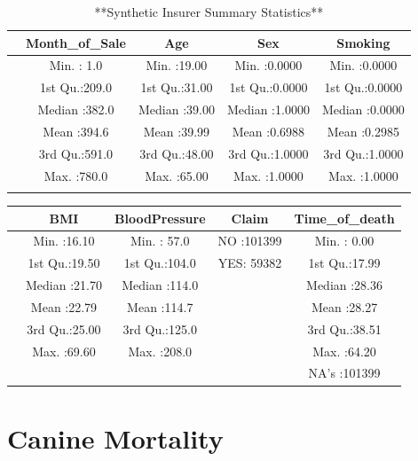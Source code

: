 \documentclass[
]{book}
\begin{document}
\begin{table}

\caption{\label{tab:unnamed-chunk-17}**Synthetic Insurer Summary Statistics**}
\centering
\begin{tabular}[t]{l|c|c|c|c}
\hline
  & Month\_of\_Sale &      Age &      Sex &    Smoking\\
\hline
 & Min.   :  1.0 & Min.   :19.00 & Min.   :0.0000 & Min.   :0.0000\\
\hline
 & 1st Qu.:209.0 & 1st Qu.:31.00 & 1st Qu.:0.0000 & 1st Qu.:0.0000\\
\hline
 & Median :382.0 & Median :39.00 & Median :1.0000 & Median :0.0000\\
\hline
 & Mean   :394.6 & Mean   :39.99 & Mean   :0.6988 & Mean   :0.2985\\
\hline
 & 3rd Qu.:591.0 & 3rd Qu.:48.00 & 3rd Qu.:1.0000 & 3rd Qu.:1.0000\\
\hline
 & Max.   :780.0 & Max.   :65.00 & Max.   :1.0000 & Max.   :1.0000\\
\hline
 &  &  &  & \\
\hline
\end{tabular}
\end{table}

\begin{table}
\centering
\begin{tabular}{l|c|c|c|c}
\hline
  &      BMI & BloodPressure & Claim & Time\_of\_death\\
\hline
 & Min.   :16.10 & Min.   : 57.0 & NO :101399 & Min.   : 0.00\\
\hline
 & 1st Qu.:19.50 & 1st Qu.:104.0 & YES: 59382 & 1st Qu.:17.99\\
\hline
 & Median :21.70 & Median :114.0 &  & Median :28.36\\
\hline
 & Mean   :22.79 & Mean   :114.7 &  & Mean   :28.27\\
\hline
 & 3rd Qu.:25.00 & 3rd Qu.:125.0 &  & 3rd Qu.:38.51\\
\hline
 & Max.   :69.60 & Max.   :208.0 &  & Max.   :64.20\\
\hline
 &  &  &  & NA's   :101399\\
\hline
\end{tabular}
\end{table}

\hypertarget{Sec:CanineMortality}{%
\section{Canine Mortality}\label{Sec:CanineMortality}}
\end{document}
